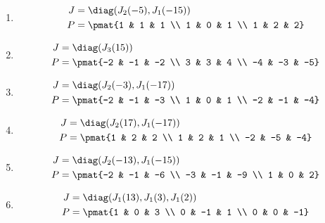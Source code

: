 \begin{enumerate}
\item

\begin{align*}
J &= \diag(J_{2}(-5), J_{1}(-15))\\
P &= \pmat{1 & 1 & 1 \\ 1 & 0 & 1 \\ 1 & 2 & 2}
\end{align*}

\item

\begin{align*}
J &= \diag(J_{3}(15))\\
P &= \pmat{-2 & -1 & -2 \\ 3 & 3 & 4 \\ -4 & -3 & -5}
\end{align*}

\item

\begin{align*}
J &= \diag(J_{2}(-3), J_{1}(-17))\\
P &= \pmat{-2 & -1 & -3 \\ 1 & 0 & 1 \\ -2 & -1 & -4}
\end{align*}

\item

\begin{align*}
J &= \diag(J_{2}(17), J_{1}(-17))\\
P &= \pmat{1 & 2 & 2 \\ 1 & 2 & 1 \\ -2 & -5 & -4}
\end{align*}

\item

\begin{align*}
J &= \diag(J_{2}(-13), J_{1}(-15))\\
P &= \pmat{-2 & -1 & -6 \\ -3 & -1 & -9 \\ 1 & 0 & 2}
\end{align*}

\item

\begin{align*}
J &= \diag(J_{1}(13), J_{1}(3), J_{1}(2))\\
P &= \pmat{1 & 0 & 3 \\ 0 & -1 & 1 \\ 0 & 0 & -1}
\end{align*}


\end{enumerate}
